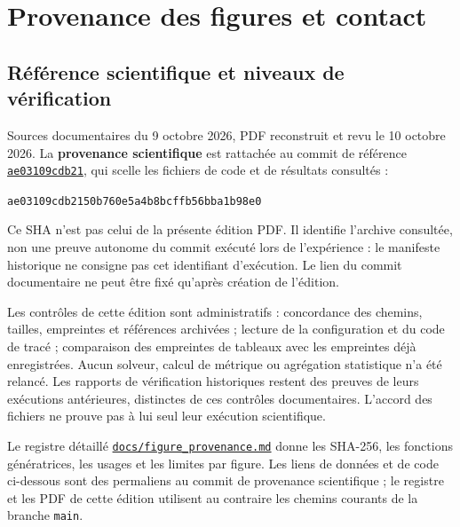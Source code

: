 \chapter{Provenance des figures et contact}
\label{ann:figure-provenance}

\section{Référence scientifique et niveaux de vérification}
Sources documentaires du 9 octobre 2026, PDF reconstruit et revu le 10 octobre
2026. La \textbf{provenance scientifique}
est rattachée au commit de référence
\href{https://github.com/halhoulmhamed-droid/pde-image-denoising/commit/ae03109cdb2150b760e5a4b8bcffb56bba1b98e0}{\texttt{ae03109cdb21}},
qui scelle les fichiers de code et de résultats consultés :
\begin{center}
\nolinkurl{ae03109cdb2150b760e5a4b8bcffb56bba1b98e0}
\end{center}
Ce SHA n'est pas celui de la présente édition PDF. Il identifie l'archive
consultée, non une preuve autonome du commit exécuté lors de l'expérience :
le manifeste historique ne consigne pas cet identifiant d'exécution.
Le lien du commit documentaire ne peut être fixé qu'après création de l'édition.

Les contrôles de cette édition sont administratifs : concordance des chemins,
tailles, empreintes et références archivées ; lecture de la configuration et
du code de tracé ; comparaison des empreintes de tableaux avec les empreintes
déjà enregistrées. Aucun solveur, calcul de métrique ou agrégation statistique
n'a été relancé. Les rapports de vérification historiques restent des preuves
de leurs exécutions antérieures, distinctes de ces contrôles documentaires.
L'accord des fichiers ne prouve pas à lui seul leur exécution scientifique.

Le registre détaillé
\href{https://github.com/halhoulmhamed-droid/pde-image-denoising/blob/main/docs/figure_provenance.md}{\texttt{docs/figure\_provenance.md}}
donne les SHA-256, les fonctions génératrices, les usages et les limites
par figure. Les liens de données et de code ci-dessous sont des permaliens
au commit de provenance scientifique ; le registre et les PDF de cette édition
utilisent au contraire les chemins courants de la branche \texttt{main}.

